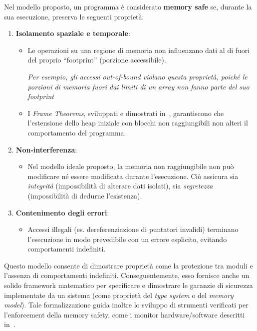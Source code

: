 Nel modello proposto, un programma è considerato \textbf{memory safe} se,
durante la sua esecuzione, preserva le seguenti proprietà:
\begin{enumerate}
  \item \textbf{Isolamento spaziale e temporale}:
    \begin{itemize}
      \item Le operazioni su una regione di memoria non influenzano dati al di fuori
        del proprio ``footprint'' (porzione accessibile).

        \textit{Per esempio, gli accessi out-of-bound violano questa proprietà,
        poiché le porzioni di memoria fuori dai limiti di un array non fanno
        parte del suo footprint}

      \item I \textit{Frame Theorems}, sviluppati e dimostrati in~\cite{meaning_memory_safety},
        garantiscono che l'estensione dello heap iniziale con blocchi non
        raggiungibili non alteri il comportamento del programma.
    \end{itemize}

  \item \textbf{Non-interferenza}:
    \begin{itemize}
      \item Nel modello ideale proposto, la memoria non raggiungibile non può
        modificare né essere modificata durante l'esecuzione. Ciò assicura sia \textit{integrità}
        (impossibilità di alterare dati isolati), sia \textit{segretezza} (impossibilità
        di dedurne l'esistenza).
    \end{itemize}

  \item \textbf{Contenimento degli errori}:
    \begin{itemize}
      \item Accessi illegali (es. dereferenziazione di puntatori invalidi)
        terminano l'esecuzione in modo prevedibile con un errore esplicito, evitando
        comportamenti indefiniti.
    \end{itemize}
\end{enumerate}

Questo modello consente di dimostrare proprietà come la protezione tra moduli e l'assenza
di comportamenti indefiniti. Conseguentemente, esso fornisce anche un solido framework
matematico per specificare e dimostrare le garanzie di sicurezza implementate da
un sistema (come proprietà del \textit{type system} o del \textit{memory model}).
Tale formalizzazione guida inoltre lo sviluppo di strumenti verificati per l'enforcement
della memory safety, come i monitor hardware/software descritti in~\cite{meaning_memory_safety}.

